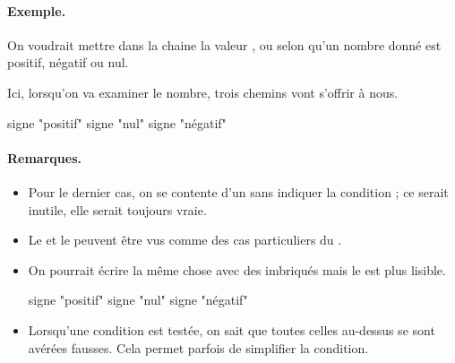 	\begin{Emphase}
		\paragraph{Exemple.}
		On voudrait mettre dans la chaine 
		la valeur , 
		ou 
		selon qu'un nombre donné est positif, négatif ou nul.
		
		Ici, lorsqu'on va examiner le nombre, 
		trois chemins vont s'offrir à nous.

		\begin{minipage}{9cm}
		\end{minipage}
		\quad
		\begin{minipage}{4cm}
			\begin{LDA}
					\Let signe \Gets "positif"
					\Let signe \Gets "nul"
				\Else
					\Let signe \Gets "négatif"
				\EndIf
			\end{LDA}
		\end{minipage}
	\end{Emphase}
		
	\paragraph{Remarques.}
	\begin{itemize}
	\item
		Pour le dernier cas, on se contente
		d'un  sans indiquer la condition ;
		ce serait inutile, elle serait toujours vraie.
	\item
		Le  et le \lda{\K{si-sinon}} 
		peuvent être vus comme des cas particuliers du 
		\lda{\K{si-sinon-si}}.
	\item
		On pourrait écrire la même chose 
		avec des  imbriqués
		mais le  est plus lisible.
		\\
		\begin{LDA}
			\If{nb>0}
				\Let signe \Gets "positif"
			\Else
				\If{nb=0}
					\Let signe \Gets "nul"
				\Else
					\Let signe \Gets "négatif"
				\EndIf
			\EndIf
		\end{LDA}
	\item
		Lorsqu'une condition est testée,
		on sait que toutes celles au-dessus
		se sont avérées fausses.
		Cela permet parfois de simplifier la condition.
	\end{itemize}
	
